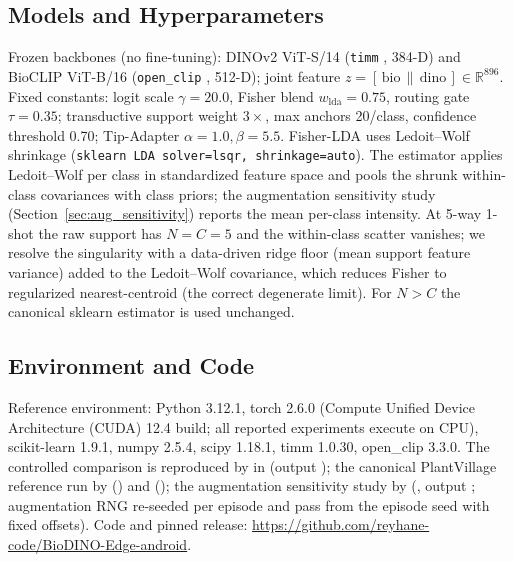 \documentclass[preprint,12pt]{elsarticle}
\begin{document}
\subsection{Models and Hyperparameters}
Frozen backbones (no fine-tuning): DINOv2 ViT-S/14 (\texttt{timm} , 384-D) and BioCLIP ViT-B/16 (\texttt{open\_clip} , 512-D); joint feature $z=[\,\text{bio}\,\|\,\text{dino}\,]\in\mathbb{R}^{896}$. Fixed constants: logit scale $\gamma=20.0$, Fisher blend $w_{\text{lda}}=0.75$, routing gate $\tau=0.35$; transductive support weight $3\times$, max anchors 20/class, confidence threshold 0.70; Tip-Adapter $\alpha=1.0,\beta=5.5$. Fisher-LDA uses Ledoit--Wolf shrinkage (\texttt{sklearn LDA solver=lsqr, shrinkage=auto}). The estimator applies Ledoit--Wolf per class in standardized feature space and pools the shrunk within-class covariances with class priors; the augmentation sensitivity study (Section~\ref{sec:aug_sensitivity}) reports the mean per-class intensity. At 5-way 1-shot the raw support has $N=C=5$ and the within-class scatter vanishes; we resolve the singularity with a data-driven ridge floor (mean support feature variance) added to the Ledoit--Wolf covariance, which reduces Fisher to regularized nearest-centroid (the correct degenerate limit). For $N>C$ the canonical sklearn estimator is used unchanged.

\subsection{Environment and Code}
Reference environment: Python 3.12.1, torch 2.6.0 (Compute Unified Device Architecture (CUDA) 12.4 build; all reported experiments execute on CPU), scikit-learn 1.9.1, numpy 2.5.4, scipy 1.18.1, timm 1.0.30, open\_clip 3.3.0. The controlled comparison is reproduced by  in  (output ); the canonical PlantVillage reference run by  () and  (); the augmentation sensitivity study by  (, output ; augmentation RNG re-seeded per episode and pass from the episode seed with fixed offsets). Code and pinned release: \url{https://github.com/reyhane-code/BioDINO-Edge-android}.
\end{document}
